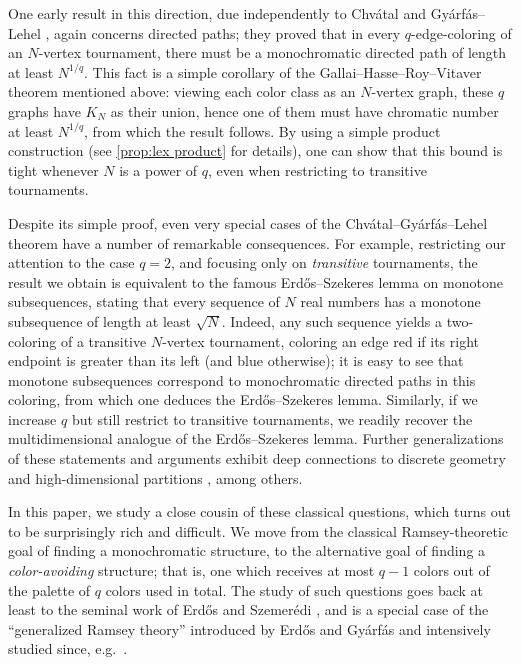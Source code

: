 \documentclass[11pt,reqno]{amsart}
\theoremstyle{definition}
\newcommand\1{\mathbf{1}}
\begin{document}
One early result in this direction, due independently to Chv\'atal \cite{MR309785} and Gy\'arf\'as--Lehel \cite{MR335354}, again concerns directed paths; they proved that in every $q$-edge-coloring of an $N$-vertex tournament, there must be a monochromatic directed path of length at least $N^{1/q}$. This fact is a simple corollary of the Gallai--Hasse--Roy--Vitaver theorem mentioned above: viewing each color class as an $N$-vertex graph, these $q$ graphs have $K_N$ as their union, hence one of them must have chromatic number at least $N^{1/q}$, from which the result follows. By using a simple product construction (see \cref{prop:lex product} for details), one can show that this bound is tight whenever $N$ is a power of $q$, even when restricting to transitive tournaments.

Despite its simple proof, even very special cases of the Chv\'atal--Gy\'arf\'as--Lehel theorem have a number of remarkable consequences. For example, restricting our attention to the case $q=2$, and focusing only on \emph{transitive} tournaments, the result we obtain is equivalent to the famous Erd\H os--Szekeres lemma \cite{MR1556929} on monotone subsequences, stating that every sequence of $N$ real numbers has a monotone subsequence of length at least $\sqrt N$. Indeed, any such sequence yields a two-coloring of a transitive $N$-vertex tournament, coloring an edge red if its right endpoint is greater than its left (and blue otherwise); it is easy to see that monotone subsequences correspond to monochromatic directed paths in this coloring, from which one deduces the Erd\H os--Szekeres lemma. Similarly, if we increase $q$ but still restrict to transitive tournaments, we readily recover the multidimensional analogue of the Erd\H os--Szekeres lemma. Further generalizations of these statements and arguments exhibit deep connections to discrete geometry \cite{MR1556929} and high-dimensional partitions \cite{MR3228450}, among others.






In this paper, we study a close cousin of these classical questions, which turns out to be surprisingly rich and difficult. 
We move from the classical Ramsey-theoretic goal of finding a monochromatic structure, to the alternative goal of finding a \emph{color-avoiding} structure; that is, one which receives at most $q-1$ colors out of the palette of $q$ colors used in total. 
The study of such questions goes back at least to the seminal work of Erd\H os and Szemer\'edi \cite{MR325446}, and is a special case of the ``generalized Ramsey theory'' introduced by Erd\H os and Gy\'arf\'as \cite{MR1645678} and intensively studied since, e.g.\ \cite{MR4975150,MR1899117,MR4563218}.
\end{document}

